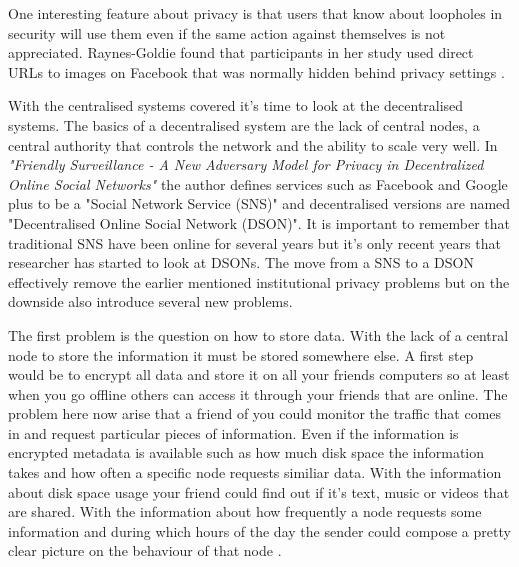 One interesting feature about privacy is that users that know about loopholes in security will use them even if the same action against themselves is not appreciated.
Raynes-Goldie found that participants in her study used direct URLs to images on Facebook that was normally hidden behind privacy settings \cite{raynes-goldie2010}.

With the centralised systems covered it's time to look at the decentralised systems.
The basics of a decentralised system are the lack of central nodes, a central authority that controls the network and the ability to scale very well.
In \textit{"Friendly Surveillance - A New Adversary Model for Privacy in Decentralized Online Social Networks"} \cite{greschbach2012} the author defines services such as Facebook and Google plus to be a "Social Network Service (SNS)" and decentralised versions are named "Decentralised Online Social Network (DSON)".
It is important to remember that traditional SNS have been online for several years but it's only recent years that researcher has started to look at DSONs.
The move from a SNS to a DSON effectively remove the earlier mentioned institutional privacy problems but on the downside also introduce several new problems.

The first problem is the question on how to store data.
With the lack of a central node to store the information it must be stored somewhere else.
A first step would be to encrypt all data and store it on all your friends computers so at least when you go offline others can access it through your friends that are online.
The problem here now arise that a friend of you could monitor the traffic that comes in and request particular pieces of information.
Even if the information is encrypted metadata is available such as how much disk space the information takes and how often a specific node requests similiar data.
With the information about disk space usage your friend could find out if it's text, music or videos that are shared.
With the information about how frequently a node requests some information and during which hours of the day the sender could compose a pretty clear picture on the behaviour of that node \cite{greschbach2012}.

